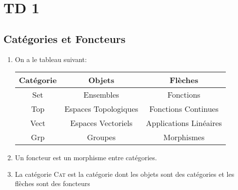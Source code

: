 \documentclass[math, info]{cours}
\begin{document}
\section{TD 1}
\subsection{Catégories et Foncteurs}
\begin{enumerate}
	\item On a le tableau suivant:
	      \begin{tabular}{>{\sc}ccc}
		      \bf Catégorie & \bf Objets           & \bf Flèches            \\
		      \midrule
		      Set           & Ensembles            & Fonctions              \\
		      Top           & Espaces Topologiques & Fonctions Continues    \\
		      Vect          & Espaces Vectoriels   & Applications Linéaires \\
		      Grp           & Groupes              & Morphismes
	      \end{tabular}
	\item Un foncteur est un morphisme entre catégories.
	\item La catégorie \textsc{Cat} est la catégorie dont les objets sont des catégories et les flèches sont des foncteurs
\end{enumerate}
\end{document}
